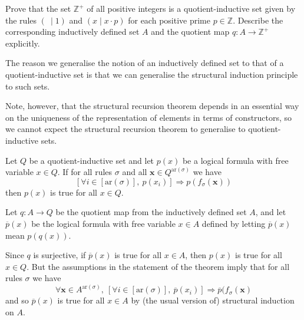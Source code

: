\begin{exercise}
Prove that the set $\mathbb{Z}^+$ of all positive integers is a quotient-inductive set given by the rules $(~ \mid 1)$ and $(x \mid x \cdot p)$ for each positive prime $p \in \mathbb{Z}$. Describe the corresponding inductively defined set $A$ and the quotient map $q : A \to \mathbb{Z}^+$ explicitly.
\end{exercise}

The reason we generalise the notion of an inductively defined set to that of a quotient-inductive set is that we can generalise the structural induction principle to such sets.

Note, however, that the structural recursion theorem depends in an essential way on the uniqueness of the representation of elements in terms of constructors, so we cannot expect the structural recursion theorem to generalise to quotient-inductive sets.

\begin{theorem}
\label{thmStructuralInductionForQuotientInductiveSets}
Let $Q$ be a quotient-inductive set and let $p(x)$ be a logical formula with free variable $x \in Q$. If for all rules $\sigma$ and all $\mathbf{x} \in Q^{\mathrm{ar}(\sigma)}$ we have
\[ [\forall i \in [\mathrm{ar}(\sigma)],~ p(x_i)] \Rightarrow p(f_{\sigma}(\mathbf{x})) \]
then $p(x)$ is true for all $x \in Q$.
\end{theorem}

\begin{cproof}
Let $q : A \to Q$ be the quotient map from the inductively defined set $A$, and let $\overline{p}(x)$ be the logical formula with free variable $x \in A$ defined by letting $\overline{p}(x)$ mean $p(q(x))$.

Since $q$ is surjective, if $\overline{p}(x)$ is true for all $x \in A$, then $p(x)$ is true for all $x \in Q$. But the assumptions in the statement of the theorem imply that for all rules $\sigma$ we have
\[ \forall \mathbf{x} \in A^{\mathrm{ar}(\sigma)},~ [\forall i \in [\mathrm{ar}(\sigma)],~ \overline{p}(x_i)] \Rightarrow \overline{p}(f_{\sigma}(\mathbf{x}) \]
and so $\overline{p}(x)$ is true for all $x \in A$ by (the usual version of) structural induction on $A$.
\end{cproof}

